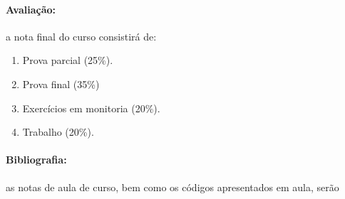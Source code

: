 \documentclass[10pt,a4paper]{article}
\begin{document}
	\paragraph{Avaliação:} a nota final do curso consistirá de:
	
	\begin{enumerate}
		\item Prova parcial (25\%).
		\item Prova final (35\%)
		\item Exercícios em monitoria (20\%).
		\item Trabalho (20\%).
	\end{enumerate}
	
	\paragraph{Bibliografia:} as notas de aula de curso, bem como os códigos apresentados em aula, serão 
\end{document}
